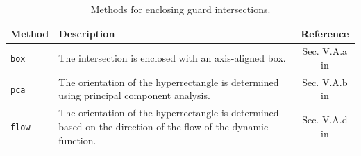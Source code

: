 \begin{table}[h]
    \centering
    \caption{Methods for enclosing guard intersections.}
    \label{tab:enclose}
    \begin{tabular}{l p{10cm} c}
        \toprule
        \textbf{Method} & \textbf{Description}                                                                                            & \textbf{Reference}                \\
        \midrule
        \texttt{box}    & The intersection is enclosed with an axis-aligned box.                                                          & Sec. V.A.a in \cite{Althoff2011f} \\
        \texttt{pca}    & The orientation of the hyperrectangle is determined using principal component analysis. & Sec. V.A.b in \cite{Althoff2011f} \\
        \texttt{flow}   & The orientation of the hyperrectangle is determined based on the direction of the flow of the dynamic function. & Sec. V.A.d in \cite{Althoff2011f} \\
        \bottomrule
    \end{tabular}
\end{table}


